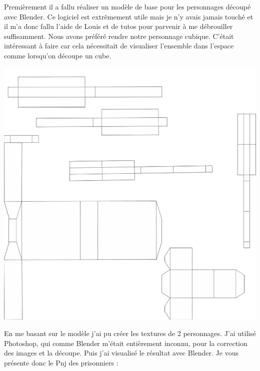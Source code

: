 \documentclass{article}
\begin{document}
\par
Premièrement il a fallu réaliser un modèle de base pour les personnages découpé avec Blender.  Ce logiciel est extrêmement utile mais je n’y avais jamais touché et il m’a donc fallu l’aide de Louis et de tutos pour parvenir à me débrouiller suffisamment. Nous avons préféré rendre notre personnage cubique. C’était intéressant à faire car cela nécessitait de visualiser l’ensemble dans l’espace comme lorsqu’on découpe un cube.
\begin{center}
\includegraphics[scale=0.3]{decoupe.jpg}
\end{center}
\newpage
En me basant sur le modèle j’ai pu créer les textures de 2 personnages. J’ai utilisé Photoshop, qui comme Blender m’était entièrement inconnu, pour la correction des images et la découpe. Puis j’ai visualisé le résultat avec Blender. Je vous présente donc le Pnj des prisonniers :
\newline
\end{document}
